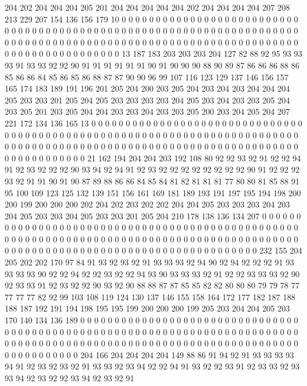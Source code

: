 204 202 204 204 204 205 201 204 204 204 204 204 202 204 204 204 204 207 208 213
229 207 154 136 156 179 10 0 0 0 0 0 0 0 0 0 0 0 0 0
0 0 0 0 0 0 0 0 0 0 0 0 0 0 0 0 0 0 0 0
0 0 0 0 0 0 0 0 0 0 0 0 0 0 0 0 0 0 0 0
0 0 0 0 0 0 0 0 0 0 0 0 0 0 0 0 0 0 0 0
0 0 0 0 0 0 0 0 0 0 0 0 0 0 0 0 0 0 0 0
0 0 0 0 0 0 0 0 0 0 0 0 0 0 0 0 0 0 0 0
0 0 0 0 0 0 0 0 0 0 0 0 0 0 0 0 13 187 183 203
203 203 204 127 82 88 92 95 93 93 93 91 93 93 92 92 90 91 91 91
91 91 91 90 91 90 90 90 88 90 89 87 86 86 86 88 86 85 86 86
84 85 86 85 86 88 87 87 90 90 96 99 107 116 123 129 137 146 156 157
165 174 183 189 191 196 201 205 204 200 203 205 204 203 204 203 204 204 204 205
203 203 201 205 204 205 203 203 203 203 204 205 203 204 203 203 205 204 203 205
201 203 205 204 204 203 203 204 203 203 205 200 203 204 205 204 207 221 172 134
136 165 13 0 0 0 0 0 0 0 0 0 0 0 0 0 0 0 0 0
0 0 0 0 0 0 0 0 0 0 0 0 0 0 0 0 0 0 0 0
0 0 0 0 0 0 0 0 0 0 0 0 0 0 0 0 0 0 0 0
0 0 0 0 0 0 0 0 0 0 0 0 0 0 0 0 0 0 0 0
0 0 0 0 0 0 0 0 0 0 0 0 0 0 0 0 0 0 0 0
0 0 0 0 0 0 0 0 0 0 0 0 0 0 0 0 0 0 0 0
0 0 0 0 0 0 0 0 0 0 0 0 21 162 194 204 204 203 192 108
80 92 92 93 92 91 92 92 94 91 92 93 92 92 92 90 93 94 92 94
91 92 93 92 92 92 92 92 92 92 92 90 91 92 92 92 93 92 91 91
90 91 90 87 89 88 86 86 84 85 84 81 82 81 81 81 77 80 80 81
85 88 91 95 100 109 123 125 132 139 151 156 161 169 181 189 193 191 197 195
194 198 200 200 199 200 200 200 202 204 202 203 202 202 204 204 205 203 203 203
204 203 204 205 203 203 204 205 203 203 201 205 204 210 178 138 136 134 207 0
0 0 0 0 0 0 0 0 0 0 0 0 0 0 0 0 0 0 0 0
0 0 0 0 0 0 0 0 0 0 0 0 0 0 0 0 0 0 0 0
0 0 0 0 0 0 0 0 0 0 0 0 0 0 0 0 0 0 0 0
0 0 0 0 0 0 0 0 0 0 0 0 0 0 0 0 0 0 0 0
0 0 0 0 0 0 0 0 0 0 0 0 0 0 0 0 0 0 0 0
0 0 0 0 0 0 0 0 0 0 0 0 0 0 0 0 0 0 0 0
0 0 0 0 0 0 0 0 232 155 204 205 202 202 170 97 84 91 93 92
93 92 91 93 93 93 92 94 90 92 94 92 92 92 91 93 93 93 93 90
92 92 94 92 92 93 92 92 94 93 90 93 93 93 92 91 92 92 93 93
93 92 90 92 93 93 91 92 93 92 92 90 93 92 90 88 88 87 87 85
85 82 82 80 80 80 79 79 78 77 77 77 77 82 92 99 103 108 119 124
130 137 146 155 158 164 172 177 182 187 188 188 187 192 191 194 198 195 195 199
200 200 200 199 205 203 204 204 205 203 170 140 134 136 189 0 0 0 0 0
0 0 0 0 0 0 0 0 0 0 0 0 0 0 0 0 0 0 0 0
0 0 0 0 0 0 0 0 0 0 0 0 0 0 0 0 0 0 0 0
0 0 0 0 0 0 0 0 0 0 0 0 0 0 0 0 0 0 0 0
0 0 0 0 0 0 0 0 0 0 0 0 0 0 0 0 0 0 0 0
0 0 0 0 0 0 0 0 0 0 0 0 0 0 0 0 0 0 0 0
0 0 0 0 0 0 0 0 0 0 0 0 0 0 0 0 0 0 0 0
0 0 0 0 204 166 204 204 204 204 149 88 86 91 94 92 91 93 93 93
93 94 91 92 93 92 93 92 91 93 93 92 93 94 92 92 94 91 93 92
92 93 91 92 93 93 92 93 93 94 92 93 92 92 93 94 92 93 92 91
